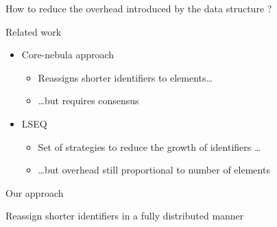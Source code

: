 \documentclass[10pt]{beamer}
\begin{document}



\begin{frame}[standout]
  \alert{How to reduce the overhead introduced by the data structure ?}
\end{frame}

\begin{frame}{Related work}
  \begin{itemize}
    \item Core-nebula approach 
    \begin{itemize}
      \item Reassigns shorter identifiers to elements\dots
      \item \dots but requires consensus
    \end{itemize}
    \item LSEQ 
    \begin{itemize}
      \item Set of strategies to reduce the growth of identifiers \dots
      \item \dots but overhead still proportional to number of elements
    \end{itemize}
  \end{itemize}
\end{frame}

\begin{frame}[standout]
  \alert{Our approach}

  \bigskip

  Reassign shorter identifiers in a fully distributed manner
\end{frame}
\end{document}
